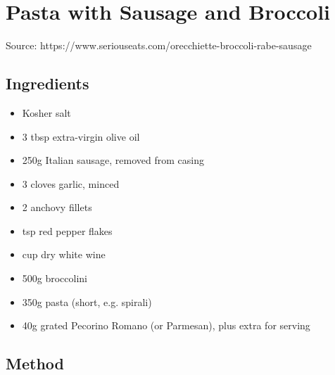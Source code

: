 \section{Pasta with Sausage and Broccoli}

  
Source: https://www.seriouseats.com/orecchiette-broccoli-rabe-sausage
  
\subsection{Ingredients}
  
\begin{itemize}
  \item Kosher salt
  \item 3 tbsp extra-virgin olive oil
  \item 250g Italian sausage, removed from casing
  \item 3 cloves garlic, minced
  \item 2 anchovy fillets
  \item {} tsp red pepper flakes
  \item {} cup dry white wine
  \item 500g broccolini
  \item 350g pasta (short, e.g. spirali)
  \item 40g grated Pecorino Romano (or Parmesan), plus extra for serving
\end{itemize}

\subsection{Method}

